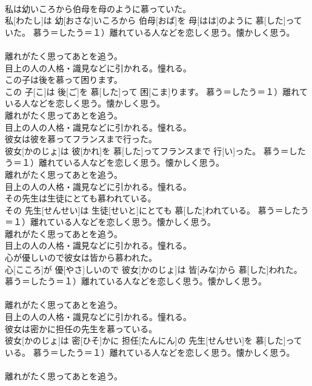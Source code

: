 \documentclass[8pt]{extreport}
\begin{document}
\begin{CJK}{UTF8}{min}
{\\	私は幼いころから伯母を母のように慕っていた。	
\\	私[わたし]は 幼[おさな]いころから 伯母[おば]を 母[はは]のように 慕[した]っていた。	慕う＝したう＝１）離れている人などを恋しく思う。懐かしく思う。 　　　　　　　
\\	離れがたく思ってあとを追う。 　　　　　　　
\\	目上の人の人格・識見などに引かれる。憧れる。
\\	この子は後を慕って困ります。	
\\	この 子[こ]は 後[ご]を 慕[した]って 困[こま]ります。	慕う＝したう＝１）離れている人などを恋しく思う。懐かしく思う。 　　　　　　　
\\	離れがたく思ってあとを追う。 　　　　　　　
\\	目上の人の人格・識見などに引かれる。憧れる。
\\	彼女は彼を慕ってフランスまで行った。	
\\	彼女[かのじょ]は 彼[かれ]を 慕[した]ってフランスまで 行[い]った。	慕う＝したう＝１）離れている人などを恋しく思う。懐かしく思う。 　　　　　　　
\\	離れがたく思ってあとを追う。 　　　　　　　
\\	目上の人の人格・識見などに引かれる。憧れる。
\\	その先生は生徒にとても慕われている。	
\\	その 先生[せんせい]は 生徒[せいと]にとても 慕[した]われている。	慕う＝したう＝１）離れている人などを恋しく思う。懐かしく思う。 　　　　　　　
\\	離れがたく思ってあとを追う。 　　　　　　　
\\	目上の人の人格・識見などに引かれる。憧れる。
\\	心が優しいので彼女は皆から慕われた。	
\\	心[こころ]が 優[やさ]しいので 彼女[かのじょ]は 皆[みな]から 慕[した]われた。	慕う＝したう＝１）離れている人などを恋しく思う。懐かしく思う。 　　　　　　　
\\	離れがたく思ってあとを追う。 　　　　　　　
\\	目上の人の人格・識見などに引かれる。憧れる。
\\	彼女は密かに担任の先生を慕っている。	
\\	彼女[かのじょ]は 密[ひそ]かに 担任[たんにん]の 先生[せんせい]を 慕[した]っている。	慕う＝したう＝１）離れている人などを恋しく思う。懐かしく思う。 　　　　　　　
\\	離れがたく思ってあとを追う。 　　　　　　　
}
\end{CJK}
\end{document}
